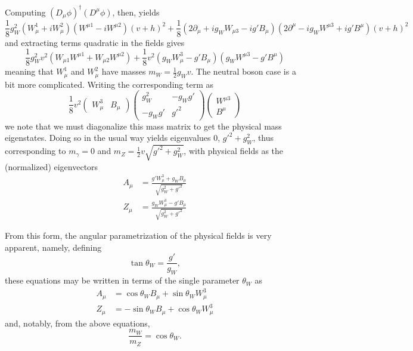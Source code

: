 Computing $(D_{\mu}\phi)^{\dagger}(D^{\mu}\phi)$, then, yields
\begin{equation}
\label{eq:hVV}
\frac{1}{8}g_{W}^2(W_{\mu}^1+iW_{\mu}^2)(W^{\mu 1}-iW^{\mu 2})(v+h)^2 + 
\frac{1}{8}(2\partial_{\mu}+ig_{W}W_{\mu 3}-ig'B_{\mu})(2\partial^{\mu}-ig_{W}W^{\mu 3}+ig'B^{\mu})(v+h)^2
\end{equation}
and extracting terms quadratic in the fields gives
\begin{equation}
\frac{1}{8}g_{W}^2v^2(W_{\mu 1}W^{\mu 1}+W_{\mu 2}W^{\mu 2}) + \frac{1}{8}v^2(g_{W}W_{\mu}^3-g'B_{\mu})(g_{W}W^{\mu 3}-g'B^{\mu})
\end{equation}
meaning that $W_{\mu}^1$ and $W_{\mu}^2$ have masses $m_{W} = \frac{1}{2}g_{W}v$. The neutral boson case 
is a bit more complicated. Writing the corresponding term as
\begin{equation}
\frac{1}{8}v^2\begin{pmatrix}W_{\mu}^3&B_{\mu}\end{pmatrix} 
\begin{pmatrix}g_{W}^2 & -g_{W}g'\\-g_{W}g' & g'^2\end{pmatrix} 
\begin{pmatrix}W^{\mu 3}\\B^{\mu}\end{pmatrix}
\end{equation}
we note that we must diagonalize this mass matrix to get the physical mass eigenstates. Doing
so in the usual way yields eigenvalues $0$, $g'^2+g_{W}^2$, thus corresponding to $m_{\gamma} = 0$ 
and $m_{Z} =\frac{1}{2}v\sqrt{g'^2+g_{W}^2}$, with physical fields as the (normalized) eigenvectors
\begin{align}
A_{\mu} &= \frac{g' W_{\mu}^{3} + g_{W}B_{\mu}}{\sqrt{g_{W}^2+g'^2}}\\
Z_{\mu} &= \frac{g_{W} W_{\mu}^{3} - g'B_{\mu}}{\sqrt{g_{W}^2+g'^2}}
\end{align}

From this form, the angular parametrization of the physical fields is very apparent, namely, defining 
\begin{equation}
\tan{\theta_{W}} = \frac{g'}{g_{W}},
\end{equation}
these equations may be written in terms of the single parameter $\theta_{W}$ as
\begin{align}
A_{\mu} &= \cos\theta_{W}B_{\mu} + \sin\theta_{W}W_{\mu}^3\\
Z_{\mu} &= -\sin\theta_{W}B_{\mu} + \cos\theta_{W}W_{\mu}^{3}
\end{align}
and, notably, from the above equations, 
\begin{equation}
\frac{m_{W}}{m_{Z}} = \cos\theta_{W}.
\end{equation}

